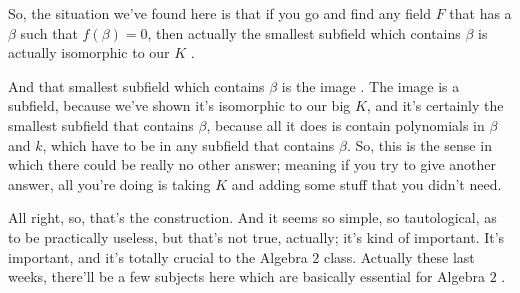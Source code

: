 \begin{content}
\begin{center}
\end{center}
\end{content}

\begin{speech}[00:15:54 - 00:17:35]
So, the situation we've found here is that if you go and find any field $F$  that has a $\beta$ such that $f(\beta) = 0$, then actually the smallest subfield which contains $\beta$ is actually isomorphic to our $K$ .

And that smallest subfield which contains $\beta$ is the image . The image is a subfield, because we've shown it's isomorphic to our big $K$, and it's certainly the smallest subfield that contains $\beta$, because all it does is contain polynomials in $\beta$ and $k$, which have to be in any subfield that contains $\beta$. So, this is the sense in which there could be really no other answer; meaning if you try to give another answer, all you're doing is taking $K$ and adding some stuff that you didn't need.

All right, so, that's the construction. And it seems so simple, so tautological, as to be practically useless, but that's not true, actually; it's kind of important. It's important, and it's totally crucial to the Algebra $2$ class. Actually these last weeks, there'll be a few subjects here which are basically essential for Algebra $2$ .
\end{speech}

